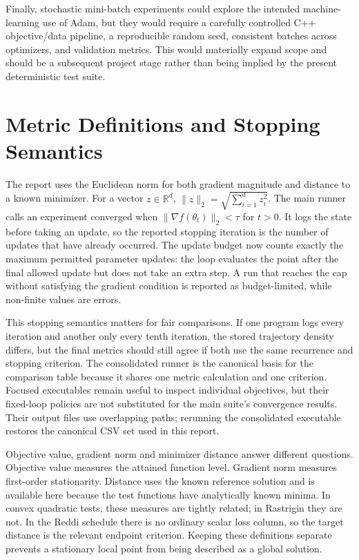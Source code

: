 \documentclass[conference]{IEEEtran}
\begin{document}
Finally, stochastic mini-batch experiments could explore the intended machine-learning use of Adam, but they would require a carefully controlled C++ objective/data pipeline, a reproducible random seed, consistent batches across optimizers, and validation metrics. This would materially expand scope and should be a subsequent project stage rather than being implied by the present deterministic test suite.

\section{Metric Definitions and Stopping Semantics}
The report uses the Euclidean norm for both gradient magnitude and distance to a known minimizer. For a vector $z\in\mathbb{R}^d$, $\|z\|_2=\sqrt{\sum_{i=1}^d z_i^2}$. The main runner calls an experiment converged when $\|\nabla f(\theta_t)\|_2<\tau$ for $t>0$. It logs the state before taking an update, so the reported stopping iteration is the number of updates that have already occurred. The update budget now counts exactly the maximum permitted parameter updates: the loop evaluates the point after the final allowed update but does not take an extra step. A run that reaches the cap without satisfying the gradient condition is reported as budget-limited, while non-finite values are errors.

This stopping semantics matters for fair comparisons. If one program logs every iteration and another only every tenth iteration, the stored trajectory density differs, but the final metrics should still agree if both use the same recurrence and stopping criterion. The consolidated runner is the canonical basis for the comparison table because it shares one metric calculation and one criterion. Focused executables remain useful to inspect individual objectives, but their fixed-loop policies are not substituted for the main suite's convergence results. Their output files use overlapping paths; rerunning the consolidated executable restores the canonical CSV set used in this report.

Objective value, gradient norm and minimizer distance answer different questions. Objective value measures the attained function level. Gradient norm measures first-order stationarity. Distance uses the known reference solution and is available here because the test functions have analytically known minima. In convex quadratic tests, these measures are tightly related; in Rastrigin they are not. In the Reddi schedule there is no ordinary scalar loss column, so the target distance is the relevant endpoint criterion. Keeping these definitions separate prevents a stationary local point from being described as a global solution.
\end{document}
